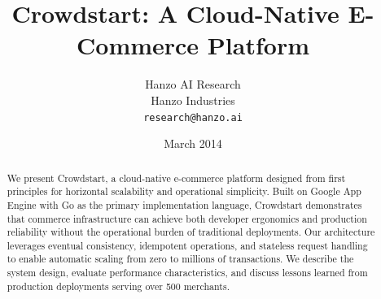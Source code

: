 \documentclass[11pt,twocolumn]{article}
\title{Crowdstart: A Cloud-Native E-Commerce Platform}
\author{Hanzo AI Research\\
Hanzo Industries\\
\texttt{research@hanzo.ai}}
\date{March 2014}
\begin{document}
\hanzocoverpage

\begin{abstract}
We present Crowdstart, a cloud-native e-commerce platform designed from first principles for horizontal scalability and operational simplicity. Built on Google App Engine with Go as the primary implementation language, Crowdstart demonstrates that commerce infrastructure can achieve both developer ergonomics and production reliability without the operational burden of traditional deployments. Our architecture leverages eventual consistency, idempotent operations, and stateless request handling to enable automatic scaling from zero to millions of transactions. We describe the system design, evaluate performance characteristics, and discuss lessons learned from production deployments serving over 500 merchants.
\end{abstract}









\end{document}
